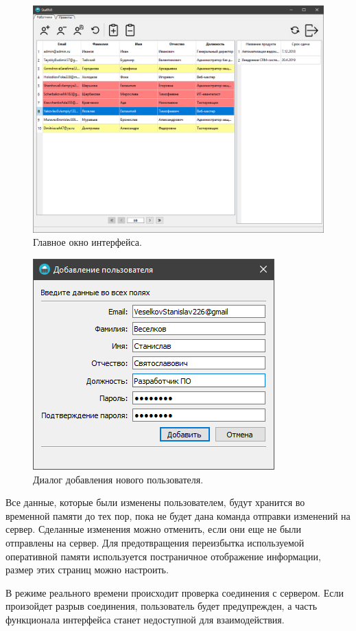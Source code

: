 \begin{figure}[h]
    \centering
    \includegraphics[width=1\linewidth]{img/main_window_win.png}
    \caption{Главное окно интерфейса.}
    \label{fig:main_window_win}
\end{figure}

\begin{figure}[h]
    \centering
    \includegraphics[width=0.4\linewidth]{img/add_user_window_win.png}
    \caption{Диалог добавления нового пользователя.}
    \label{fig:add_user_window_win}
\end{figure}

Все данные, которые были изменены пользователем, будут хранится во временной памяти до тех пор, пока не будет дана команда отправки изменений на сервер.
Сделанные изменения можно отменить, если они еще не были отправлены на сервер.
Для предотвращения переизбытка используемой оперативной памяти используется постраничное отображение информации, размер этих страниц можно настроить.

В режиме реального времени происходит проверка соединения с сервером. Если произойдет разрыв соединения, пользователь будет предупрежден,
а часть функционала интерфейса станет недоступной для взаимодействия.

